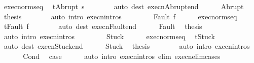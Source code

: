 \begin{isabellebody}
\ exec{\isacharunderscore}norm{\isacharunderscore}seq\ \isamarkupfalse%
\ {\isachardoublequoteopen}t{\isacharequal}Abrupt\ s{\isacharprime}{\isachardoublequoteclose}\isanewline
\ \ \ \ \ \ \isamarkupfalse%
\ {\isacharparenleft}auto\ dest{\isacharcolon}\ execn{\isacharunderscore}Abrupt{\isacharunderscore}end{\isacharparenright}\isanewline
\ \ \ \ \isamarkupfalse%
\ Abrupt\ \isamarkupfalse%
\ {\isacharquery}thesis\isanewline
\ \ \ \ \ \ \isamarkupfalse%
\ {\isacharparenleft}auto\ intro{\isacharcolon}\ execn{\isachardot}intros{\isacharparenright}\isanewline
\ \ \isamarkupfalse%
\isanewline
\ \ \ \ \isamarkupfalse%
\ {\isacharparenleft}Fault\ f{\isacharparenright}\isanewline
\ \ \ \ \isamarkupfalse%
\ exec{\isacharunderscore}norm{\isacharunderscore}seq\ \isamarkupfalse%
\ {\isachardoublequoteopen}t{\isacharequal}Fault\ f{\isachardoublequoteclose}\isanewline
\ \ \ \ \ \ \isamarkupfalse%
\ {\isacharparenleft}auto\ dest{\isacharcolon}\ execn{\isacharunderscore}Fault{\isacharunderscore}end{\isacharparenright}\isanewline
\ \ \ \ \isamarkupfalse%
\ Fault\ \isamarkupfalse%
\ {\isacharquery}thesis\isanewline
\ \ \ \ \ \ \isamarkupfalse%
\ {\isacharparenleft}auto\ intro{\isacharcolon}\ execn{\isachardot}intros{\isacharparenright}\isanewline
\ \ \isamarkupfalse%
\isanewline
\ \ \ \ \isamarkupfalse%
\ Stuck\isanewline
\ \ \ \ \isamarkupfalse%
\ exec{\isacharunderscore}norm{\isacharunderscore}seq\ \isamarkupfalse%
\ {\isachardoublequoteopen}t{\isacharequal}Stuck{\isachardoublequoteclose}\isanewline
\ \ \ \ \ \ \isamarkupfalse%
\ {\isacharparenleft}auto\ dest{\isacharcolon}\ execn{\isacharunderscore}Stuck{\isacharunderscore}end{\isacharparenright}\isanewline
\ \ \ \ \isamarkupfalse%
\ Stuck\ \isamarkupfalse%
\ {\isacharquery}thesis\isanewline
\ \ \ \ \ \ \isamarkupfalse%
\ {\isacharparenleft}auto\ intro{\isacharcolon}\ execn{\isachardot}intros{\isacharparenright}\isanewline
\ \ \isamarkupfalse%
\isanewline
{}\isamarkupfalse%
\isanewline
\ \ \isamarkupfalse%
\ Cond\ \isamarkupfalse%
\ {\isacharquery}case\isanewline
\ \ \ \ \isamarkupfalse%
\ {\isacharparenleft}auto\ intro{\isacharcolon}\ execn{\isachardot}intros\ elim{\isacharbang}{\isacharcolon}\ execn{\isacharunderscore}elim{\isacharunderscore}cases{\isacharparenright}\isanewline

\end{isabellebody}
